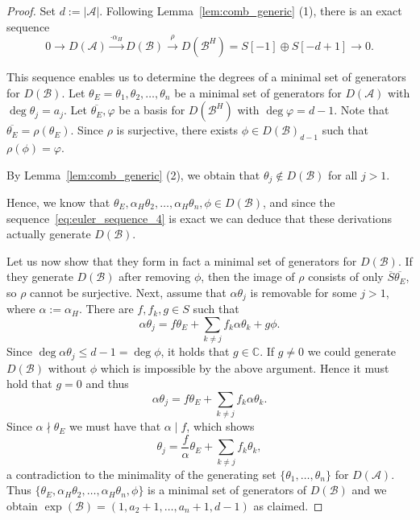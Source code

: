 \documentclass[a4paper,11pt]{amsart}
\def\CC{{\mathbb{C}}}%
\def\C{{\mathbb{C}}}%
\def\A{{\mathcal{A}}}%
\def\B{{\mathcal{B}}}%
\def\C{{\mathcal{C}}}%
\numberwithin{equation}{section}
\theoremstyle{remark}
\begin{document}
\begin{proof}
Set $d:=|\A|$. Following Lemma~\ref{lem:comb_generic} (1), there is an exact sequence
\begin{equation}\label{eq:euler_sequence_4}
0 \rightarrow D(\A) \stackrel{\cdot \alpha_{H}}{\rightarrow }
D(\B) \stackrel{\rho}{\rightarrow } D(\B^{H})=S[-1]
\oplus S[-d+1] \rightarrow 0.
\end{equation}

This sequence enables us to determine the degrees of a minimal set of generators for $D(\B).$
Let $\theta_E=\theta_1,\theta_2,\ldots,\theta_{n}$ be a minimal set of generators for $D(\A)$ with $\deg \theta_j=a_j$.
Let $\overline{\theta_E},\varphi$ be a basis for $D(\B^{H})$ with $\deg \varphi=d-1$.
Note that $\overline{\theta_E}=\rho(\theta_E)$.
Since $\rho $ is surjective, there exists $\phi \in D(\B)_{d-1}$ such that 
$\rho(\phi)=\varphi$.

By Lemma~\ref{lem:comb_generic} (2), we obtain that $\theta_j \not \in D(\B)$ for all $j >1$.

Hence, we know that $\theta_E,\alpha_{H} \theta_2,\ldots,\alpha_{H} \theta_{n},\phi \in D(\B)$, and since the sequence~\eqref{eq:euler_sequence_4} is exact we can deduce that these derivations actually generate $D(\B)$.

Let us now show that they form in fact a minimal set of generators for $D(\B)$.
If they generate $D(\B)$ after removing $\phi$, then the image of $\rho$ consists of only $\overline{S} \overline{\theta_E}$, so $\rho$ cannot 
be surjective.
Next, assume that $\alpha \theta_j$ is removable for some $j>1$, where $\alpha:=\alpha_{H}$.
There are $f,f_k,g\in S$ such that
$$
\alpha \theta_{j}=f \theta_E+\sum_{k \neq j} f_k \alpha \theta_k +g \phi.
$$
Since $\deg \alpha\theta_j\le  d-1=\deg \phi$, it holds that $g\in \CC$.
If $g\neq 0$ we could generate $D(\B)$ without $\phi$ which is impossible by the above argument.
Hence it must hold that $g=0$ and thus
$$
\alpha \theta_{j}=f \theta_E+\sum_{k \neq j} f_k \alpha \theta_k.
$$
Since $\alpha \nmid \theta_E$ we must have that $\alpha \mid f$, which shows
$$
\theta_{j}=\frac{f}{\alpha} \theta_E+\sum_{k \neq j} f_k  \theta_k,
$$
 a contradiction to the minimality of the generating set $\{\theta_1, \ldots ,\theta_{n}\}$ for $D(\A)$.
Thus $\{\theta_E,\alpha_{H} \theta_2, \ldots ,\alpha_{H} \theta_{n},\phi\}$ is a minimal set of generators of $D(\B)$ and we obtain $\exp(\B)=(1,a_2+1,\dots,a_n+1,d-1)$ as claimed.
\end{proof}
\end{document}
